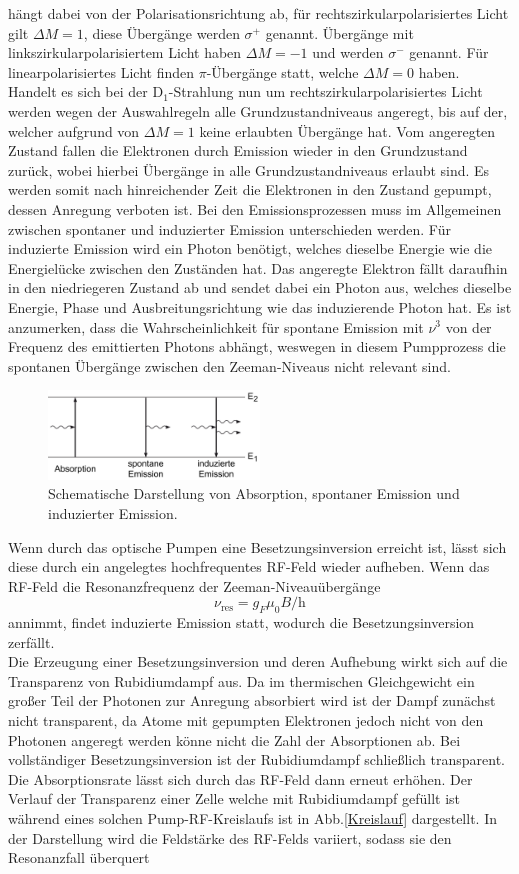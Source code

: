  hängt dabei von der Polarisationsrichtung ab, für rechtszirkularpolarisiertes Licht gilt $\Delta M=1$, diese Übergänge werden $\sigma^+$ genannt. Übergänge mit linkszirkularpolarisiertem Licht haben $\Delta M=-1$ und werden $\sigma^-$ genannt.
Für linearpolarisiertes Licht finden $\pi$-Übergänge statt, welche $\Delta M=0$ haben. Handelt es sich bei der D$_1$-Strahlung nun um rechtszirkularpolarisiertes Licht werden wegen der Auswahlregeln alle Grundzustandniveaus angeregt, bis auf der, welcher aufgrund von $\Delta M=1$ keine erlaubten Übergänge hat. Vom angeregten Zustand fallen die Elektronen durch Emission wieder in den Grundzustand zurück, wobei hierbei Übergänge in alle Grundzustandniveaus erlaubt sind. Es werden somit nach hinreichender Zeit die Elektronen in den Zustand gepumpt, dessen Anregung verboten ist.
Bei den Emissionsprozessen muss im Allgemeinen zwischen spontaner und induzierter Emission unterschieden werden. Für induzierte Emission wird ein Photon benötigt, welches dieselbe Energie wie die Energielücke zwischen den Zuständen hat. Das angeregte Elektron fällt daraufhin in den niedriegeren Zustand ab und sendet dabei ein Photon aus, welches dieselbe Energie, Phase und Ausbreitungsrichtung wie das induzierende Photon hat.
Es ist anzumerken, dass die Wahrscheinlichkeit für spontane Emission mit $\nu^3$ von der Frequenz des emittierten Photons abhängt, weswegen in diesem Pumpprozess die spontanen Übergänge zwischen den Zeeman-Niveaus nicht relevant sind.
\begin{figure}
  \centering
  \includegraphics[width=0.5\textwidth]{Bilder/Emission}
  \caption{Schematische Darstellung von Absorption, spontaner Emission und induzierter Emission.\cite{Emission}}
\end{figure}
Wenn durch das optische Pumpen eine Besetzungsinversion erreicht ist, lässt sich diese durch ein angelegtes hochfrequentes RF-Feld wieder aufheben. Wenn das RF-Feld die Resonanzfrequenz der Zeeman-Niveauübergänge
\begin{equation}
  \nu_{\text{res}}=g_F\mu_0B/\text{h}
\end{equation}
annimmt, findet induzierte Emission statt, wodurch die Besetzungsinversion zerfällt.\\
Die Erzeugung einer Besetzungsinversion und deren Aufhebung wirkt sich auf die Transparenz von Rubidiumdampf aus. Da im thermischen Gleichgewicht ein großer Teil der Photonen zur Anregung absorbiert wird ist der Dampf zunächst nicht transparent, da Atome mit gepumpten Elektronen jedoch nicht von den Photonen angeregt werden könne nicht die Zahl der Absorptionen ab. Bei vollständiger Besetzungsinversion ist der Rubidiumdampf schließlich transparent. Die Absorptionsrate lässt sich durch das RF-Feld dann erneut erhöhen. Der Verlauf der Transparenz einer Zelle welche mit Rubidiumdampf gefüllt ist während eines solchen Pump-RF-Kreislaufs ist in Abb.\ref{Kreislauf} dargestellt.  In der Darstellung wird die Feldstärke des RF-Felds variiert, sodass sie den Resonanzfall überquert
